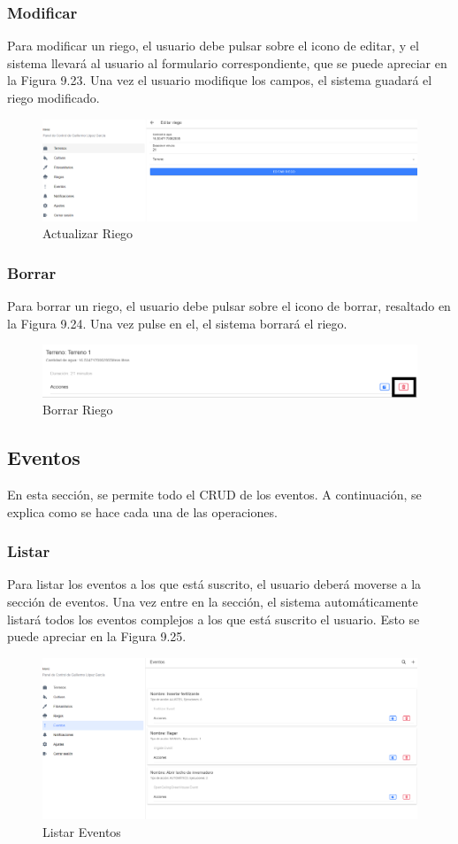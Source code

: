 \subsubsection{Modificar}
Para modificar un riego, el usuario debe pulsar sobre el icono de editar, y el sistema llevará al usuario al formulario correspondiente, que se puede apreciar en la Figura 9.23. Una vez el usuario modifique los campos, el sistema guadará el riego modificado.
\begin{figure}[H]
    \centering
    \includegraphics[width=0.7\linewidth]{images/user-manual/irrigate/update.png}
    \caption{Actualizar Riego}
\end{figure}

\subsubsection{Borrar}
Para borrar un riego, el usuario debe pulsar sobre el icono de borrar, resaltado en la Figura 9.24. Una vez pulse en el, el sistema borrará el riego.
\begin{figure}[H]
    \centering
    \includegraphics[width=0.7\linewidth]{images/user-manual/irrigate/delete.png}
    \caption{Borrar Riego}
\end{figure}

\subsection{Eventos}
En esta sección, se permite todo el CRUD de los eventos. A continuación, se explica como se hace cada una de las operaciones.

\subsubsection{Listar}
Para listar los eventos a los que está suscrito, el usuario deberá moverse a la sección de eventos. Una vez entre en la sección, el sistema automáticamente listará todos los eventos complejos a los que está suscrito el usuario. Esto se puede apreciar en la Figura 9.25.
\begin{figure}[H]
    \centering
    \includegraphics[width=0.7\linewidth]{images/user-manual/events/list.png}
    \caption{Listar Eventos}
\end{figure}

